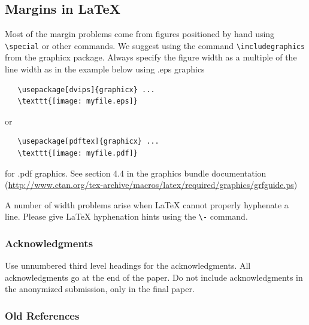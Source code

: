 \documentclass{article} %
\begin{document}
\subsection{Margins in LaTeX}
 
Most of the margin problems come from figures positioned by hand using
\verb+\special+ or other commands. We suggest using the command
\verb+\includegraphics+
from the graphicx package. Always specify the figure width as a multiple of
the line width as in the example below using .eps graphics
\begin{verbatim}
   \usepackage[dvips]{graphicx} ... 
   \texttt{[image: myfile.eps]} 
\end{verbatim}
or %
\begin{verbatim}
   \usepackage[pdftex]{graphicx} ... 
   \texttt{[image: myfile.pdf]} 
\end{verbatim}
for .pdf graphics. 
See section 4.4 in the graphics bundle documentation (\url{http://www.ctan.org/tex-archive/macros/latex/required/graphics/grfguide.ps}) 
 
A number of width problems arise when LaTeX cannot properly hyphenate a
line. Please give LaTeX hyphenation hints using the \verb+\-+ command.


\subsubsection*{Acknowledgments}

Use unnumbered third level headings for the acknowledgments. All
acknowledgments go at the end of the paper. Do not include 
acknowledgments in the anonymized submission, only in the 
final paper. 

\fi 





\subsubsection*{Old References}

\end{document}
